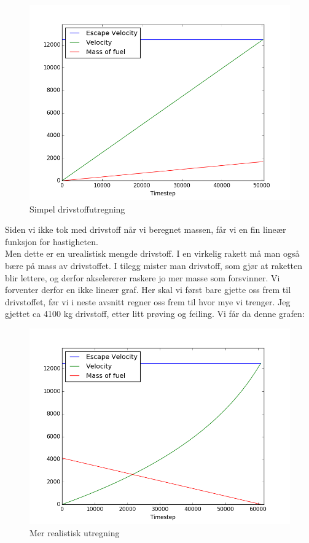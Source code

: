 \documentclass[a4paper,norsk,11pt,twoside]{article}
\begin{document}
\begin{figure}[hbt]
\begin{center}
\includegraphics[width=\textwidth]{Fuel_simple.png}
\caption{Simpel drivstoffutregning}\label{fig:finfigur}
\end{center}
\end{figure} 


Siden vi ikke tok med drivstoff når vi beregnet massen, får vi en fin lineær funksjon for hastigheten. \\

Men dette er en urealistisk mengde drivstoff. I en virkelig rakett må man også bære på mass av drivstoffet. I tilegg mister man drivstoff, som gjør at raketten blir lettere, og derfor akselererer raskere jo mer masse som forsvinner. Vi forventer derfor en ikke lineær graf. Her skal vi først bare gjette oss frem til drivstoffet, før vi i neste avsnitt regner oss frem til hvor mye vi trenger. Jeg gjettet ca 4100 kg drivstoff, etter litt prøving og feiling. Vi får da denne grafen:

\begin{figure}[hbt]
\begin{center}
\includegraphics[width=\textwidth]{Fuel_real.png}
\caption{Mer realistisk utregning}\label{fig:finfigur}
\end{center}
\end{figure} 
\end{document}
